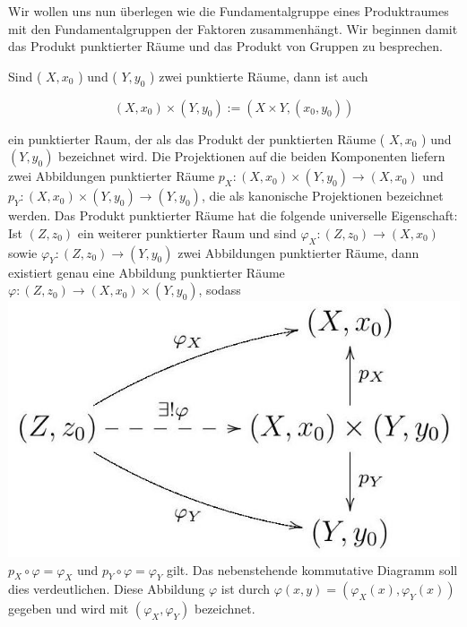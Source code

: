 \documentclass[10pt]{article}
\begin{document}
Wir wollen uns nun überlegen wie die Fundamentalgruppe eines Produktraumes mit den Fundamentalgruppen der Faktoren zusammenhängt. Wir beginnen damit das Produkt punktierter Räume und das Produkt von Gruppen zu besprechen.

Sind ( $X, x_{0}$ ) und ( $Y, y_{0}$ ) zwei punktierte Räume, dann ist auch

$$
\left(X, x_{0}\right) \times\left(Y, y_{0}\right):=\left(X \times Y,\left(x_{0}, y_{0}\right)\right)
$$

ein punktierter Raum, der als das Produkt der punktierten Räume ( $X, x_{0}$ ) und $\left(Y, y_{0}\right)$ bezeichnet wird. Die Projektionen auf die beiden Komponenten liefern zwei Abbildungen punktierter Räume $p_{X}:\left(X, x_{0}\right) \times\left(Y, y_{0}\right) \rightarrow\left(X, x_{0}\right)$ und $p_{Y}:\left(X, x_{0}\right) \times\left(Y, y_{0}\right) \rightarrow\left(Y, y_{0}\right)$, die als kanonische Projektionen bezeichnet werden. Das Produkt punktierter Räume hat die folgende universelle Eigenschaft: Ist $\left(Z, z_{0}\right)$ ein weiterer punktierter Raum und sind $\varphi_{X}:\left(Z, z_{0}\right) \rightarrow\left(X, x_{0}\right)$ sowie $\varphi_{Y}:\left(Z, z_{0}\right) \rightarrow\left(Y, y_{0}\right)$ zwei Abbildungen punktierter Räume, dann existiert genau eine Abbildung punktierter Räume $\varphi:\left(Z, z_{0}\right) \rightarrow\left(X, x_{0}\right) \times\left(Y, y_{0}\right)$, sodass\\
\includegraphics[max width=\textwidth]{2025_06_05_d7ed2bacd1e9ce1db1f0g-009} $p_{X} \circ \varphi=\varphi_{X}$ und $p_{Y} \circ \varphi=\varphi_{Y}$ gilt. Das nebenstehende kommutative Diagramm soll dies verdeutlichen. Diese Abbildung $\varphi$ ist durch $\varphi(x, y)=\left(\varphi_{X}(x), \varphi_{Y}(x)\right)$ gegeben und wird mit $\left(\varphi_{X}, \varphi_{Y}\right)$ bezeichnet.
\end{document}
